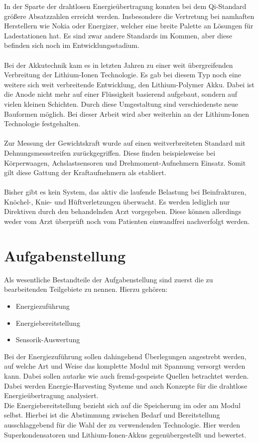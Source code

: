 \documentclass[12pt]{scrreprt} %
\begin{document}

In der Sparte der drahtlosen Energieübertragung konnten bei dem Qi-Standard größere Absatzzahlen erreicht werden. Insbesondere die Vertretung bei namhaften Herstellern wie Nokia \citep{NOKIA} oder Energizer\citep{ENERGIZER}, welcher eine breite Palette an Lösungen für Ladestationen hat. Es sind zwar andere Standards im Kommen, aber diese befinden sich noch im Entwicklungsstadium.\\
\\
Bei der Akkutechnik kam es in letzten Jahren zu einer weit übergreifenden Verbreitung der Lithium-Ionen Technologie. Es gab bei diesem Typ noch eine weitere sich weit verbreitende Entwicklung, den Lithium-Polymer Akku. Dabei ist die Anode nicht mehr auf einer Flüssigkeit basierend aufgebaut, sondern auf vielen kleinen Schichten. Durch diese Umgestaltung sind verschiedenste neue Bauformen möglich. Bei dieser Arbeit wird aber weiterhin an der Lithium-Ionen Technologie festgehalten.\\
\\
Zur Messung der Gewichtskraft wurde auf einen weitverbreiteten Standard mit Dehnungsmessstreifen zurückgegriffen. Diese finden beispielsweise bei Körperwaagen, Achslastsensoren und Drehmoment-Aufnehmern Einsatz. Somit gilt diese Gattung der Kraftaufnehmern als etabliert.\\
\\
Bisher gibt es kein System, das aktiv die laufende Belastung bei Beinfrakturen, Knöchel-, Knie- und Hüftverletzungen überwacht. Es werden lediglich nur Direktiven durch den behandelnden Arzt vorgegeben. Diese können allerdings weder vom Arzt überprüft noch vom Patienten einwandfrei nachverfolgt werden.


\section{Aufgabenstellung}
Als wesentliche Bestandteile der Aufgabenstellung sind zuerst die zu bearbeitenden Teilgebiete zu nennen. Hierzu gehören:
\begin{itemize}
\item
Energiezuführung
\item
Energiebereitstellung
\item
Sensorik-Auswertung
\end{itemize}
Bei der Energiezuführung sollen dahingehend Überlegungen angestrebt werden, auf welche Art und Weise das komplette Modul mit Spannung versorgt werden kann. Dabei sollen autarke wie auch fremd-gespeiste Quellen betrachtet werden. Dabei werden Energie-Harvesting Systeme und auch Konzepte für die drahtlose Energieübertragung analysiert. \\
Die Energiebereitstellung bezieht sich auf die Speicherung im oder am Modul selbst. Hierbei ist die Abstimmung zwischen Bedarf und Bereitstellung ausschlaggebend für die Wahl der zu verwendenden Technologie. Hier werden Superkondensatoren und Lithium-Ionen-Akkus gegenübergestellt und bewertet. \\
\end{document}
